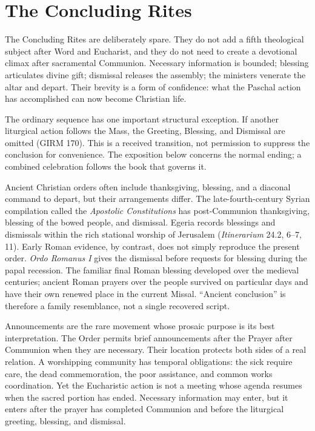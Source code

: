 \section{The Concluding Rites}

The Concluding Rites are deliberately spare. They do not add a fifth theological subject after Word and Eucharist, and they do not need to create a devotional climax after sacramental Communion. Necessary information is bounded; blessing articulates divine gift; dismissal releases the assembly; the ministers venerate the altar and depart. Their brevity is a form of confidence: what the Paschal action has accomplished can now become Christian life.

The ordinary sequence has one important structural exception. If another liturgical action follows the Mass, the Greeting, Blessing, and Dismissal are omitted (GIRM 170). This is a received transition, not permission to suppress the conclusion for convenience. The exposition below concerns the normal ending; a combined celebration follows the book that governs it.

Ancient Christian orders often include thanksgiving, blessing, and a diaconal command to depart, but their arrangements differ. The late-fourth-century Syrian compilation called the \emph{Apostolic Constitutions} has post-Communion thanksgiving, blessing of the bowed people, and dismissal. Egeria records blessings and dismissals within the rich stational worship of Jerusalem (\emph{Itinerarium} 24.2, 6--7, 11). Early Roman evidence, by contrast, does not simply reproduce the present order. \emph{Ordo Romanus I} gives the dismissal before requests for blessing during the papal recession. The familiar final Roman blessing developed over the medieval centuries; ancient Roman prayers over the people survived on particular days and have their own renewed place in the current Missal. ``Ancient conclusion'' is therefore a family resemblance, not a single recovered script.


Announcements are the rare movement whose prosaic purpose is its best interpretation. The Order permits brief announcements after the Prayer after Communion when they are necessary. Their location protects both sides of a real relation. A worshipping community has temporal obligations: the sick require care, the dead commemoration, the poor assistance, and common works coordination. Yet the Eucharistic action is not a meeting whose agenda resumes when the sacred portion has ended. Necessary information may enter, but it enters after the prayer has completed Communion and before the liturgical greeting, blessing, and dismissal.

